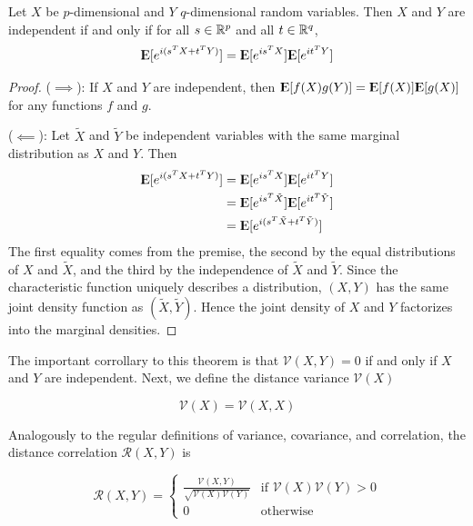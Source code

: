 \begin{theorem}
Let $X$ be $p$-dimensional and $Y$ $q$-dimensional random variables.
Then $X$ and $Y$ are independent if and only if for all $s \in \mathbb{R}^p$
and all $t \in \mathbb{R}^q$,
\[ {\rm I\kern-.3em E}[e^{i (s^T X + t^T Y)}]
 = {\rm I\kern-.3em E}[e^{i s^T X}] {\rm I\kern-.3em E}[e^{i t^T Y}] \]
\end{theorem}
\begin{proof}
($\implies$): If $X$ and $Y$ are independent, then
${\rm I\kern-.3em E}[f(X) g(Y)] = {\rm I\kern-.3em E}[f(X)] {\rm I\kern-.3em E}[g(X)]$ for any functions
$f$ and $g$.

($\impliedby$): Let $\tilde{X}$ and $\tilde{Y}$ be independent
variables with the same marginal distribution as $X$ and $Y$. Then
\begin{align*}
{\rm I\kern-.3em E}[e^{i (s^T X + t^T Y)}]
&= {\rm I\kern-.3em E}[e^{i s^T X}] {\rm I\kern-.3em E}[e^{i t^T Y}] \\
&= {\rm I\kern-.3em E}[e^{i s^T \tilde{X}}] {\rm I\kern-.3em E}[e^{i t^T \tilde{Y}}] \\
&= {\rm I\kern-.3em E}[e^{i (s^T \tilde{X} + t^T \tilde{Y})}]
\end{align*}
The first equality comes from the premise, the second by the equal
distributions of $X$ and $\tilde{X}$, and the third by the independence
of $\tilde{X}$ and $\tilde{Y}$. Since the characteristic function
uniquely describes a distribution, $(X, Y)$ has the same joint
density function as $(\tilde{X}, \tilde{Y})$. Hence the joint density
of $X$ and $Y$ factorizes into the marginal densities.
\end{proof}

The important corrollary to this theorem is that $\mathcal{V}(X,Y) = 0$
if and only if $X$ and $Y$ are independent. Next, we define the
distance variance $\mathcal{V}(X)$

\begin{definition}
$$ \mathcal{V} (X) = \mathcal{V} (X,X) $$
\end{definition}

Analogously to the regular definitions of variance, covariance, and
correlation, the distance correlation $\mathcal{R}(X,Y)$ is

\begin{definition}
\[ \mathcal{R} (X,Y) = \begin{cases}
  \frac{\mathcal{V}(X,Y)}{\sqrt{\mathcal{V}(X) \mathcal{V}(Y)}}
  & \text{if } \mathcal{V}(X) \mathcal{V}(Y) > 0 \\
  0 & \text{otherwise}
\end{cases} \]
\end{definition}

